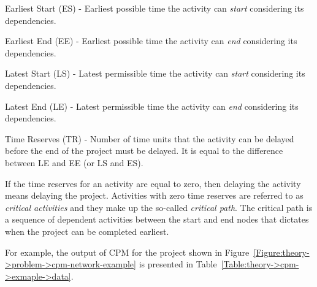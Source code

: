 \begin{tight_itemize}
	\item Earliest Start (ES) - Earliest possible time the activity can \textit{start} considering its dependencies.
	\item Earliest End (EE) - Earliest possible time the activity can \textit{end} considering its dependencies.
	\item Latest Start (LS) - Latest permissible time the activity can \textit{start} considering its dependencies.
	\item Latest End (LE) - Latest permissible time the activity can \textit{end} considering its dependencies.
	\item Time Reserves (TR) - Number of time units that the activity can be delayed before the end of the project must be delayed.
		It is equal to the difference between LE and EE (or LS and ES).
\end{tight_itemize}

If the time reserves for an activity are equal to zero, then delaying the activity means delaying the project.
Activities with zero time reserves are referred to as \textit{critical activities} and they make up the so-called \textit{critical path}.
The critical path is a sequence of dependent activities between the start and end nodes that dictates when the project can be completed earliest.

For example, the output of CPM for the project shown in Figure~\ref{Figure:theory->problem->cpm-network-example} is presented in Table~\ref{Table:theory->cpm->exmaple->data}.

